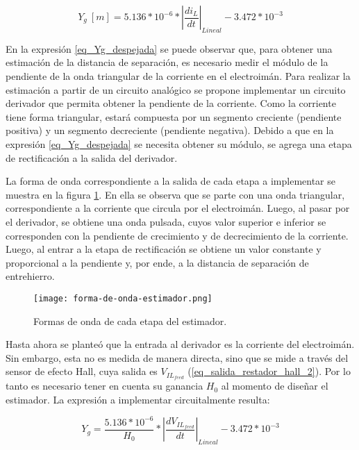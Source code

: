 \begin{equation} \label{eq_Yg_despejada}
	Y_g\:[m] =5.136*10^{-6}*{\left|\frac{di_L}{dt}\right|}_{Lineal} - 3.472*10^{-3}
\end{equation}


En la expresión \ref{eq_Yg_despejada} se puede observar que, para obtener una estimación de la distancia de separación, es necesario medir el módulo de la pendiente de la onda triangular de la corriente en el electroimán. Para realizar la estimación a partir de un circuito analógico se propone implementar un circuito derivador que permita obtener la pendiente de la corriente. Como la corriente tiene forma triangular, estará compuesta por un segmento creciente (pendiente positiva) y un segmento decreciente (pendiente negativa). Debido a que en la expresión \ref{eq_Yg_despejada} se necesita obtener su módulo, se agrega una etapa de rectificación a la salida del derivador.

La forma de onda correspondiente a la salida de cada etapa a implementar se muestra en la figura \ref{fig:img_forma-de-onda-estimador}. En ella se observa que se parte con una onda triangular, correspondiente a la corriente que circula por el electroimán. Luego, al pasar por el derivador, se obtiene una onda pulsada, cuyos valor superior e inferior se corresponden con la pendiente de crecimiento y de decrecimiento de la corriente. Luego, al entrar a la etapa de rectificación se obtiene un valor constante y proporcional a la pendiente y, por ende, a la distancia de separación de entrehierro.


\begin{figure}[H]
	\centering
	\texttt{[image: forma-de-onda-estimador.png]}
	\caption{Formas de onda de cada etapa del estimador.}
	\label{fig:img_forma-de-onda-estimador}
\end{figure}



Hasta ahora se planteó que la entrada al derivador es la corriente del electroimán. Sin embargo, esta no es medida de manera directa, sino que se mide a través del sensor de efecto Hall, cuya salida es $V_{IL_{feed}}$ (\ref{eq_salida_restador_hall_2}). Por lo tanto es necesario tener en cuenta su ganancia $H_0$ al momento de diseñar el estimador. La expresión a implementar circuitalmente resulta:

\begin{equation} \label{eq_Yg_salida_sensor}
	Y_g=\frac{5.136*10^{-6}}{H_0}*{\left|\frac{dV_{IL_{feed}}}{dt}\right|}_{Lineal} - 3.472*10^{-3}
\end{equation}

